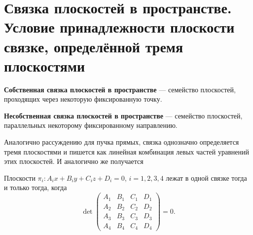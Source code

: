 \section{Связка плоскостей в пространстве. Условие принадлежности плоскости связке, определённой тремя плоскостями}

\begin{definition}
    \textbf{Собственная связка плоскостей в пространстве} --- семейство плоскостей, проходящих через некоторую фиксированную точку.
\end{definition}

\begin{definition}
    \textbf{Несобственная связка плоскостей в пространстве} --- семейство плоскостей, параллельных некоторому фиксированному направлению.
\end{definition}

Аналогично рассуждению для пучка прямых, связка однозначно определяется тремя плоскостями и пишется как линейная комбинация левых частей уравнений этих плоскостей. И аналогично же получается

\begin{statement}
    Плоскости $\pi_i: A_ix + B_iy + C_iz + D_i = 0$, $i = 1, 2, 3, 4$ лежат в одной связке тогда и только тогда, когда
    $$\det
    \begin{pmatrix}
        A_1 & B_1 & C_1 & D_1\\
        A_2 & B_2 & C_2 & D_2\\
        A_3 & B_3 & C_3 & D_3\\
        A_4 & B_4 & C_4 & D_4
    \end{pmatrix} = 0.
    $$
\end{statement}


